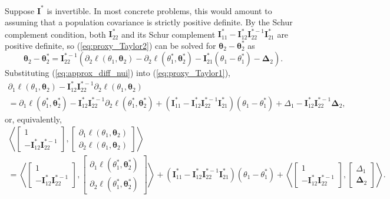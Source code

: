 \documentclass[11pt]{article}
\numberwithin{equation}{section}
\numberwithin{theorem}{section}
\def\Ib{\mathbf{I}}
\def\fattheta{\boldsymbol{\theta}}
\def\fatDelta{\boldsymbol{\Delta}}
\theoremstyle{definition}
\theoremstyle{remark}
\begin{document}
Suppose $\Ib^*$ is invertible.
In most concrete problems, this would amount to assuming that a population covariance is strictly positive definite.
By the Schur complement condition, both $\Ib^*_{22}$ and its Schur complement $\Ib^*_{11} - \Ib^*_{12} \Ib^{*-1}_{22} \Ib^*_{21}$ are positive definite, so (\ref{eq:proxy_Taylor2}) can be solved for $\fattheta_2 - \fattheta_2^*$ as
\begin{equation} \label{eq:approx_diff_nui}
\fattheta_2 - \fattheta_2^*
= \Ib^{*-1}_{22} \left( \partial_2 \ell(\theta_1,\fattheta_2) - \partial_2 \ell(\theta_1^*,\fattheta_2^*) - \Ib^*_{21} (\theta_1 - \theta_1^*) - \fatDelta_2 \right).
\end{equation}
Substituting (\ref{eq:approx_diff_nui}) into (\ref{eq:proxy_Taylor1}),
\begin{multline}
\partial_1 \ell(\theta_1,\fattheta_2) - \Ib^*_{12} \Ib^{*-1}_{22} \partial_2 \ell(\theta_1,\fattheta_2) \\
= \partial_1 \ell(\theta_1^*,\fattheta_2^*) - \Ib^*_{12} \Ib^{*-1}_{22} \partial_2 \ell(\theta_1^*,\fattheta_2^*) + (\Ib^*_{11} - \Ib^*_{12} \Ib^{*-1}_{22} \Ib^*_{21}) (\theta_1 - \theta_1^*)  + \Delta_1 - \Ib^*_{12} \Ib^{*-1}_{22} \fatDelta_2,
\end{multline}
or, equivalently,
\begin{multline} \label{eq:Taylor_orth_score}
\left\langle \begin{bmatrix} 1 \\ -\Ib^*_{12} \Ib^{*-1}_{22} \end{bmatrix},
\begin{bmatrix} \partial_1 \ell(\theta_1,\fattheta_2) \\ \partial_2 \ell(\theta_1,\fattheta_2) \end{bmatrix} \right\rangle \\
=
\left\langle \begin{bmatrix} 1 \\ -\Ib^*_{12} \Ib^{*-1}_{22} \end{bmatrix},
\begin{bmatrix} \partial_1 \ell(\theta_1^*,\fattheta_2^*) \\ \partial_2 \ell(\theta_1^*,\fattheta_2^*) \end{bmatrix} \right\rangle
+ (\Ib^*_{11} - \Ib^*_{12} \Ib^{*-1}_{22} \Ib^*_{21}) (\theta_1 - \theta_1^*)
+ \left\langle \begin{bmatrix} 1 \\ -\Ib^*_{12} \Ib^{*-1}_{22} \end{bmatrix},
\begin{bmatrix} \Delta_1 \\ \fatDelta_2 \end{bmatrix} \right\rangle.
\end{multline}
\end{document}
